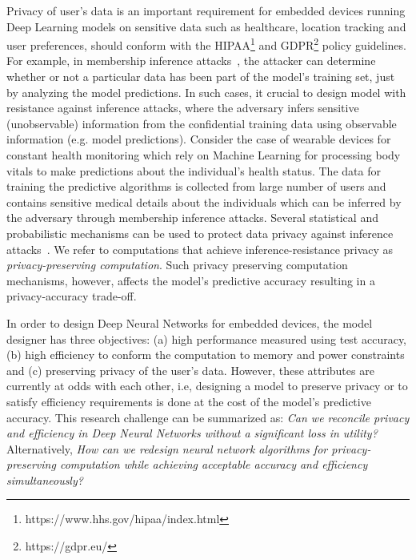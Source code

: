Privacy of user's data is an important requirement for embedded devices running Deep Learning models on sensitive data such as healthcare, location tracking and user preferences, should conform with the HIPAA\footnote{https://www.hhs.gov/hipaa/index.html} and GDPR\footnote{https://gdpr.eu/} policy guidelines.
For example, in membership inference attacks~\cite{shokri2017membership}, the attacker can determine whether or not a particular data has been part of the model's training set, just by analyzing the model predictions.
In such cases, it crucial to design model with resistance against inference attacks, where the adversary infers sensitive (unobservable) information from the confidential training data using observable information (e.g. model predictions).
Consider the case of wearable devices for constant health monitoring which rely on Machine Learning for processing body vitals to make predictions about the individual's health status.
The data for training the predictive algorithms is collected from large number of users and contains sensitive medical details about the individuals which can be inferred by the adversary through membership inference attacks.
Several statistical and probabilistic mechanisms can be used to protect data privacy against inference attacks~\cite{dwork2006calibrating, abadi2016deep}.
We refer to computations that achieve inference-resistance privacy as {\em privacy-preserving computation}.
Such privacy preserving computation mechanisms, however, affects the model's predictive accuracy resulting in a privacy-accuracy trade-off.

In order to design Deep Neural Networks for embedded devices, the model designer has three objectives: (a) high performance measured using test accuracy, (b) high efficiency to conform the computation to memory and power constraints and (c) preserving privacy of the user's data.
However, these attributes are currently at odds with each other, i.e, designing a model to preserve privacy or to satisfy efficiency requirements is done at the cost of the model's predictive accuracy.
This research challenge can be summarized as: \textit{Can we reconcile privacy and efficiency in Deep Neural Networks without a significant loss in utility?}
Alternatively, \textit{How can we redesign neural network algorithms for privacy-preserving computation while achieving acceptable accuracy and efficiency simultaneously?}


